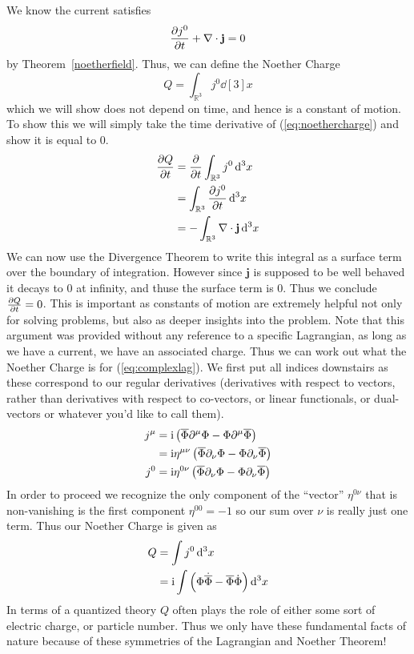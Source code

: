 We know the current satisfies
\begin{equation}
    \pdv{j^0}{t} + \nabla\cdot\mathbf{j} = 0
\end{equation}
by Theorem~\ref{noetherfield}. Thus, we can define the Noether Charge
\begin{equation}\label{eq:noethercharge}
    Q = \int_{\mathbb{R}^3}j^0\dd[3]{x}
\end{equation}
which we will show does not depend on time, and hence is a constant of motion.
To show this we will simply take the time derivative of (\ref{eq:noethercharge})
and show it is equal to 0.
\begin{align}
    \pdv{Q}{t} & = \pdv{t}\int_{\mathbb{R}^3}j^0\dd[3]{x} \\
               & = \int_{\mathbb{R}^3}\pdv{j^0}{t}\dd[3]{x} \\
               & = -\int_{\mathbb{R}^3}\nabla\cdot\mathbf{j}\dd[3]{x}
\end{align}
We can now use the Divergence Theorem to write this integral as a surface term
over the boundary of integration. However since \(\mathbf{j}\) is supposed to be
well behaved it decays to 0 at infinity, and thuse the surface term is 0. Thus
we conclude \(\pdv{Q}{t} = 0\). This is important as constants of motion
are extremely helpful not only for solving problems, but also as deeper insights
into the problem. Note that this argument was provided without any reference to
a specific Lagrangian, as long as we have a current, we have an associated
charge. Thus we can work out what the Noether Charge is for
(\ref{eq:complexlag}). We first put all indices downstairs as these correspond
to our regular derivatives (derivatives with respect to vectors, rather than
derivatives with respect to co-vectors, or linear functionals, or dual-vectors
or whatever you'd like to call them).
\begin{align}
    j^\mu & = \mathrm{i}\left(\overline{\Phi}\partial^\mu\Phi - \Phi\partial^\mu\overline{\Phi}\right) \\
          & = \mathrm{i}\eta^{\mu\nu}\left(\overline{\Phi}\partial_\nu\Phi - \Phi\partial_\nu\overline{\Phi}\right) \\
    j^0   & = \mathrm{i}\eta^{0\nu}\left(\overline{\Phi}\partial_\nu\Phi - \Phi\partial_\nu\overline{\Phi}\right)
\end{align}
In order to proceed we recognize the only component of the ``vector''
\(\eta^{0\nu}\) that is non-vanishing is the first component \(\eta^{00} = -1\)
so our sum over \(\nu\) is really just one term. Thus our Noether Charge is
given as
\begin{align}
    Q & = \int j^0\dd[3]{x} \\
      & = \mathrm{i}\int\left(\Phi\dot{\overline{\Phi}} - \overline{\Phi}\dot{\Phi}\right)\dd[3]{x}\label{eq:charge}
\end{align}
In terms of a quantized theory \(Q\) often plays the role of either some sort of
electric charge, or particle number. Thus we only have these fundamental facts
of nature because of these symmetries of the Lagrangian and Noether Theorem!

